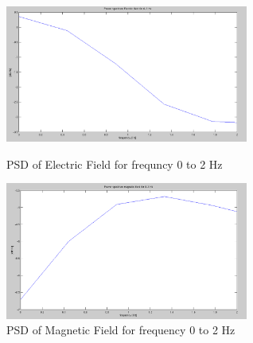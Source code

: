 \documentclass{article}
\begin{document}
\begin{figure}[htb!]
\begin{minipage}[c]{0.5\linewidth}
\centering
\includegraphics[width=8cm]{Figures/PSD_electric_z_2.png}
\caption{PSD of Electric Field for frequncy 0 to 2 Hz}
\label{fig:PSD_electric_z_2}
\end{minipage}
\hspace{0.1cm}
\begin{minipage}[c]{0.5\linewidth}
\centering
\includegraphics[width=8cm]{Figures/PSD_magnetic_z_2.png}
\caption{PSD of Magnetic Field for frequency 0 to 2 Hz}
\label{fig:PSD_magnetic_z_2}
\end{minipage}
\end{figure}
\end{document}
